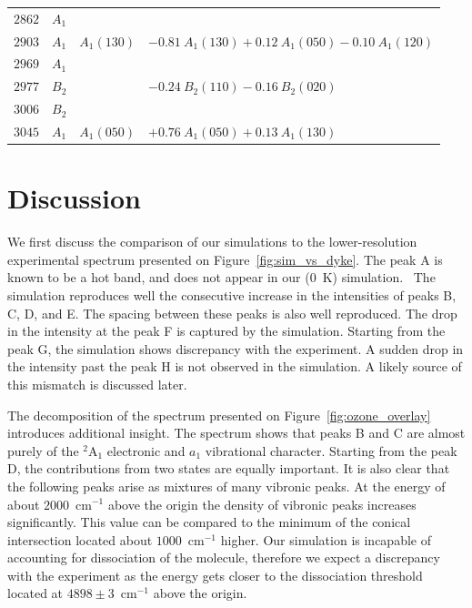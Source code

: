 \documentclass[
12pt,
a4paper,
prb,
superscriptaddress,
]{revtex4}
\begin{document}
\begin{table}
\begin{tabular}{|l|l|l|l|}
$  2862$ & $A_1$ &             & \\ 
$  2903$ & $A_1$ &  $A_1(130)$ & $ -0.81~A_1(130) +0.12~A_1(050) -0.10~A_1(120)$ \\
$  2969$ & $A_1$ &             & \\ 
$  2977$ & $B_2$ &             & $ -0.24~B_2(110) -0.16~B_2(020)$ \\
$  3006$ & $B_2$ &             & \\ 
$  3045$ & $A_1$ &  $A_1(050)$ & $ +0.76~A_1(050) +0.13~A_1(130)$ \\
        \hline
    \end{tabular}
\end{table}


\section{Discussion} 

We first discuss the comparison of our simulations to the lower-resolution
experimental spectrum presented on Figure~\ref{fig:sim_vs_dyke}. The peak A is
known to be a hot band, and does not appear in our ($0$~K)
simulation.~\cite{KDC:O3:92} The simulation reproduces well the consecutive
increase in the intensities of peaks B, C, D, and E. The spacing between these
peaks is also well reproduced. The drop in the intensity at the peak F is
captured by the simulation. Starting from the peak G, the simulation shows
discrepancy with the experiment. A sudden drop in the intensity past the peak
H is not observed in the simulation. A likely source of this mismatch is
discussed later.

The decomposition of the spectrum presented on Figure~\ref{fig:ozone_overlay}
introduces additional insight. The spectrum shows that peaks B and C are
almost purely of the $^2$A$_1$ electronic and $a_1$ vibrational character.
Starting from the peak D, the contributions from two states are equally
important. It is also clear that the following peaks arise as mixtures of many
vibronic peaks. At the energy of about $2000$~cm$^{-1}$ above the origin the
density of vibronic peaks increases significantly. This value can be compared
to the minimum of the conical intersection located about $1000$~cm$^{-1}$
higher. Our simulation is incapable of accounting for dissociation of the
molecule, therefore we expect a discrepancy with the experiment as the energy
gets closer to the dissociation threshold located at $4898\pm3$~cm$^{-1}$
above the origin.~\cite{Willitsch:O3ZEKE:2005}
\end{document}
